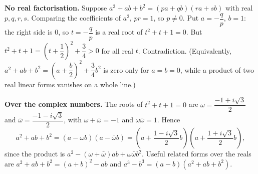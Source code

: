 \textbf{No real factorisation.} Suppose $a^2+ab+b^2=(pa+qb)(ra+sb)$ with real $p,q,r,s$. Comparing the coefficients of $a^2$, $pr=1$, so $p\ne0$. Put $a=-\dfrac {q}{p}$, $b=1$: the right side is $0$, so $t=-\dfrac {q}{p}$ is a real root of $t^2+t+1=0$. But $t^2+t+1=\left(t+\dfrac{1}{2}\right)^2+\dfrac{3}{4}>0$ for all real $t$. Contradiction. (Equivalently, $a^2+ab+b^2=\left(a+\dfrac {b}{2}\right)^2+\dfrac{3}{4}b^2$ is zero only for $a=b=0$, while a product of two real linear forms vanishes on a whole line.)

\textbf{Over the complex numbers.} The roots of $t^2+t+1=0$ are $\omega=\dfrac{-1+i\sqrt3}{2}$ and $\bar\omega=\dfrac{-1-i\sqrt3}{2}$, with $\omega+\bar\omega=-1$ and $\omega\bar\omega=1$. Hence
\[
\boxed{a^2+ab+b^2=(a-\omega b)(a-\bar\omega b)=\left(a+\dfrac{1-i\sqrt3}{2}b\right)\left(a+\dfrac{1+i\sqrt3}{2}b\right)},
\]
since the product is $a^2-(\omega+\bar\omega)ab+\omega\bar\omega b^2$. Useful related forms over the reals are $a^2+ab+b^2=(a+b)^2-ab$ and $a^3-b^3=(a-b)\left(a^2+ab+b^2\right)$.
